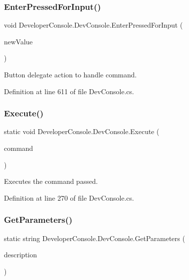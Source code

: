 \subsubsection{\texorpdfstring{Enter\+Pressed\+For\+Input()}{EnterPressedForInput()}}
{\footnotesize\ttfamily void Developer\+Console.\+Dev\+Console.\+Enter\+Pressed\+For\+Input (\begin{DoxyParamCaption}\item[{Text}]{new\+Value }\end{DoxyParamCaption})}



Button delegate action to handle command. 



Definition at line 611 of file Dev\+Console.\+cs.

\mbox{\label{class_developer_console_1_1_dev_console_ae69b7bfc81cb59ea2ec6f6d0ccdb33e4}} 
\subsubsection{\texorpdfstring{Execute()}{Execute()}}
{\footnotesize\ttfamily static void Developer\+Console.\+Dev\+Console.\+Execute (\begin{DoxyParamCaption}\item[{string}]{command }\end{DoxyParamCaption})\hspace{0.3cm}{\ttfamily [static]}}



Executes the command passed. 



Definition at line 270 of file Dev\+Console.\+cs.

\mbox{\label{class_developer_console_1_1_dev_console_a2cae3e00ffac10262d3c47b0ca4a7390}} 
\subsubsection{\texorpdfstring{Get\+Parameters()}{GetParameters()}}
{\footnotesize\ttfamily static string Developer\+Console.\+Dev\+Console.\+Get\+Parameters (\begin{DoxyParamCaption}\item[{\hyperlink{class_developer_console_1_1_core_1_1_command_base}{Command\+Base}}]{description }\end{DoxyParamCaption})\hspace{0.3cm}{\ttfamily [static]}}



